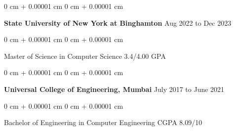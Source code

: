 \documentclass[10pt, letterpaper]{article}
\newenvironment{onecolentry}{
    \begin{adjustwidth}{
        0 cm + 0.00001 cm
    }{
        0 cm + 0.00001 cm
    }
}{
    \end{adjustwidth}
} %
\newcommand{\resumeheading}[2]{%
    \begin{onecolentry}
        #1 \hfill #2
    \end{onecolentry}
} %
\begin{document}
\resumeheading{\textbf{State University of New York at Binghamton}}{Aug 2022 to Dec 2023}

\begin{onecolentry}
	Master of Science in Computer Science \hfill 3.4/4.00 GPA
\end{onecolentry}

\vspace{0.08 cm}

\resumeheading{\textbf{Universal College of Engineering, Mumbai}}{July 2017 to June 2021}

\begin{onecolentry}
	Bachelor of Engineering in Computer Engineering \hfill CGPA 8.09/10
\end{onecolentry}
\end{document}
